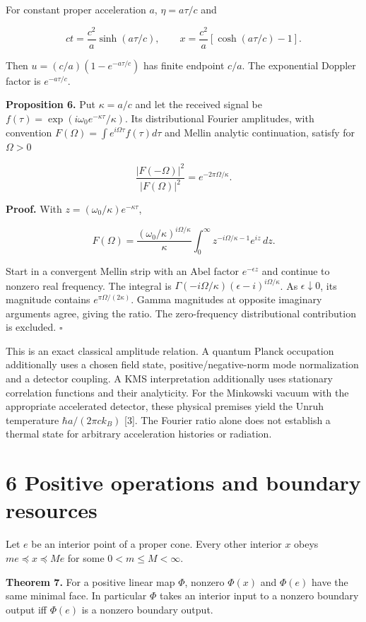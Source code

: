 \documentclass[
  11pt,
  a4paper,
]{article}
\begin{document}
For constant proper acceleration \(a\), \(\eta=a\tau/c\) and

\[ct=\frac{c^2}{a}\sinh(a\tau/c),\qquad
x=\frac{c^2}{a}[\cosh(a\tau/c)-1].\]

Then \(u=(c/a)(1-e^{-a\tau/c})\) has finite endpoint \(c/a\). The exponential Doppler factor is \(e^{-a\tau/c}\).

\textbf{Proposition 6.} Put \(\kappa=a/c\) and let the received signal be \(f(\tau)=\exp(i\omega_0e^{-\kappa\tau}/\kappa)\). Its distributional Fourier amplitudes, with convention \(F(\Omega)=\int e^{i\Omega\tau}f(\tau)d\tau\) and Mellin analytic continuation, satisfy for \(\Omega>0\)

\[\frac{|F(-\Omega)|^2}{|F(\Omega)|^2}=e^{-2\pi\Omega/\kappa}.\]

\textbf{Proof.} With \(z=(\omega_0/\kappa)e^{-\kappa\tau}\),

\[F(\Omega)=\frac{(\omega_0/\kappa)^{i\Omega/\kappa}}{\kappa}
\int_0^\infty z^{-i\Omega/\kappa-1}e^{iz}\,dz.\]

Start in a convergent Mellin strip with an Abel factor \(e^{-\epsilon z}\) and continue to nonzero real frequency. The integral is \(\Gamma(-i\Omega/\kappa)(\epsilon-i)^{i\Omega/\kappa}\). As \(\epsilon\downarrow0\), its magnitude contains \(e^{\pi\Omega/(2\kappa)}\). Gamma magnitudes at opposite imaginary arguments agree, giving the ratio. The zero-frequency distributional contribution is excluded. \(\square\)

This is an exact classical amplitude relation. A quantum Planck occupation additionally uses a chosen field state, positive/negative-norm mode normalization and a detector coupling. A KMS interpretation additionally uses stationary correlation functions and their analyticity. For the Minkowski vacuum with the appropriate accelerated detector, these physical premises yield the Unruh temperature \(\hbar a/(2\pi c k_B)\) {[}3{]}. The Fourier ratio alone does not establish a thermal state for arbitrary acceleration histories or radiation.

\section{6 Positive operations and boundary resources}\label{positive-operations-and-boundary-resources}

Let \(e\) be an interior point of a proper cone. Every other interior \(x\) obeys \(me\preceq x\preceq Me\) for some \(0<m\le M<\infty\).

\textbf{Theorem 7.} For a positive linear map \(\Phi\), nonzero \(\Phi(x)\) and \(\Phi(e)\) have the same minimal face. In particular \(\Phi\) takes an interior input to a nonzero boundary output iff \(\Phi(e)\) is a nonzero boundary output.
\end{document}
